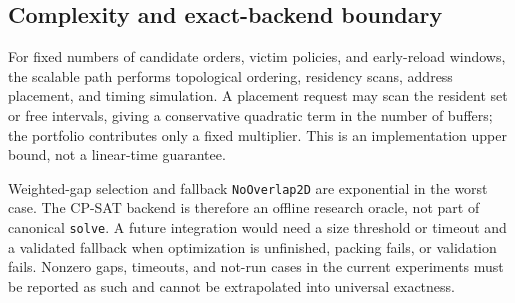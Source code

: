 \subsection{Complexity and exact-backend boundary}

For fixed numbers of candidate orders, victim policies, and early-reload windows, the scalable path performs topological ordering, residency scans, address placement, and timing simulation. A placement request may scan the resident set or free intervals, giving a conservative quadratic term in the number of buffers; the portfolio contributes only a fixed multiplier. This is an implementation upper bound, not a linear-time guarantee.

Weighted-gap selection and fallback \texttt{NoOverlap2D} are exponential in the worst case. The CP-SAT backend is therefore an offline research oracle, not part of canonical \texttt{solve}. A future integration would need a size threshold or timeout and a validated fallback when optimization is unfinished, packing fails, or validation fails. Nonzero gaps, timeouts, and not-run cases in the current experiments must be reported as such and cannot be extrapolated into universal exactness.
